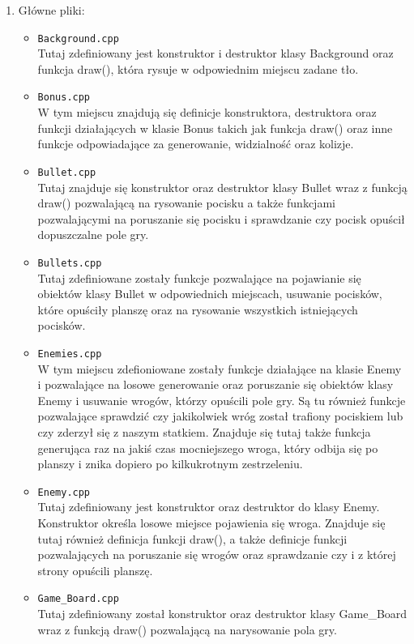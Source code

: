 \documentclass{article}
\begin{document}
\begin{normalsize}
\begin{enumerate}
\begin{itemize}
			\end{itemize}
		\item Główne pliki:
			\begin{itemize}
				\item \verb;Background.cpp;\\
					Tutaj zdefiniowany jest konstruktor i destruktor klasy Background oraz funkcja draw(), która rysuje w odpowiednim miejscu zadane tło.
				\item \verb;Bonus.cpp;\\
					W tym miejscu znajdują się definicje konstruktora, destruktora oraz funkcji działających w klasie Bonus takich jak funkcja draw() oraz inne funkcje odpowiadające za generowanie, widzialność oraz kolizje.
				\item \verb;Bullet.cpp;\\
					Tutaj znajduje się konstruktor oraz destruktor klasy Bullet wraz z funkcją draw() pozwalającą na rysowanie pocisku a także funkcjami pozwalającymi na poruszanie się pocisku i sprawdzanie czy pocisk opuścił dopuszczalne pole gry.
				\item \verb;Bullets.cpp;\\
					Tutaj zdefiniowane zostały funkcje pozwalające na pojawianie się obiektów klasy Bullet w odpowiednich miejscach, usuwanie pocisków, które opuściły planszę oraz na rysowanie wszystkich istniejących pocisków.
				\item \verb;Enemies.cpp;\\
					W tym miejscu zdefioniowane zostały funkcje działające na klasie Enemy i pozwalające na losowe generowanie oraz poruszanie się obiektów klasy Enemy i usuwanie wrogów, którzy opuścili pole gry. Są tu również funkcje pozwalające sprawdzić czy jakikolwiek wróg został trafiony pociskiem lub czy zderzył się z naszym statkiem. Znajduje się tutaj także funkcja generująca raz na jakiś czas mocniejszego wroga, który odbija się po planszy i znika dopiero po kilkukrotnym zestrzeleniu.
				\item \verb;Enemy.cpp;\\
					Tutaj zdefiniowany jest konstruktor oraz destruktor do klasy Enemy. Konstruktor określa losowe miejsce pojawienia się wroga. Znajduje się tutaj również definicja funkcji draw(), a także definicje funkcji pozwalających na poruszanie się wrogów oraz sprawdzanie czy i z której strony opuścili planszę.
				\item \verb;Game_Board.cpp;\\
					Tutaj zdefiniowany został konstruktor oraz destruktor klasy Game\_Board wraz z funkcją draw() pozwalającą na narysowanie pola gry.

\end{itemize}
\end{enumerate}
\end{normalsize}
\end{document}
